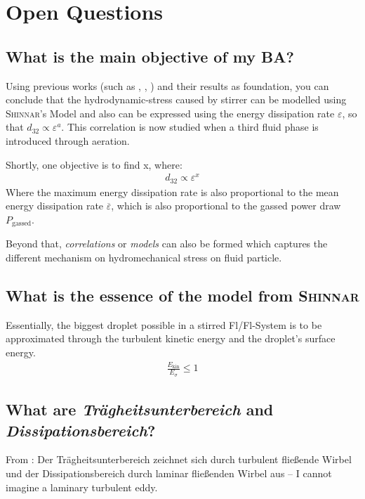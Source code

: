 \chapter{Open Questions}

\section{What is the main objective of my BA?}
Using previous works (such as \citet{zhou1998correlation}, \citet{henzler1996modelluntersuchungen}, \citet{langer2000verstandnis}) and their results as foundation, you can conclude that the hydrodynamic-stress caused by stirrer can be modelled using \textsc{Shinnar}'s Model and also can be expressed using the energy dissipation rate $\varepsilon$, so that $d_{32} \propto \varepsilon^a$. This correlation is now studied when a third fluid phase is introduced through aeration.

Shortly, one objective is to find x, where:
\begin{align}
    d_{32} \propto \varepsilon^x
\end{align}
Where the maximum energy dissipation rate is also proportional to the mean energy dissipation rate $\overline{\varepsilon}$, which is also proportional to the gassed power draw $P_\text{gassed}$.

Beyond that, \textit{correlations} or \textit{models} can also be formed which captures the different mechanism on hydromechanical stress on fluid particle.
\vspace{5cm}

\section{What is the essence of the model from \textsc{Shinnar}}
Essentially, the biggest droplet possible in a stirred Fl/Fl-System is to be approximated through the turbulent kinetic energy and the droplet's surface energy.
\begin{align}
    \frac{E_\text{kin}}{E_\sigma} \leqslant 1
\end{align}
\vspace{5cm}

\section{What are \textit{Tr\"agheitsunterbereich} and \textit{Dissipationsbereich}?}
From \citet{Wollny2010Diss}: Der Trägheitsunterbereich zeichnet sich durch turbulent flie\ss{}ende Wirbel und der Dissipationsbereich
durch laminar flie\ss{}enden Wirbel aus -- I cannot imagine a laminary turbulent eddy.
\vspace{5cm}

